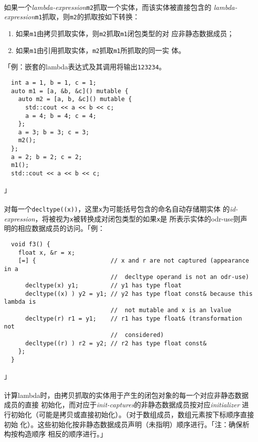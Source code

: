 \paragraph{}
如果一个\textit{lambda-expression}\texttt{m2}抓取一个实体，而该实体被直接包含的
\textit{lambda-expression}\texttt{m1}抓取，则\texttt{m2}的抓取按如下转换：
\begin{enumerate}
  \item{如果\texttt{m1}由拷贝抓取实体，则\texttt{m2}抓取\texttt{m1}闭包类型的对
    应非静态数据成员；}
  \item{如果\texttt{m1}由引用抓取实体，\texttt{m2}抓取\texttt{m1}所抓取的同一实
    体。}
\end{enumerate}
「例：嵌套的lambda表达式及其调用将输出\texttt{123234}。
\begin{lstlisting}
  int a = 1, b = 1, c = 1;
  auto m1 = [a, &b, &c]() mutable {
    auto m2 = [a, b, &c]() mutable {
      std::cout << a << b << c;
      a = 4; b = 4; c = 4;
    };
    a = 3; b = 3; c = 3;
    m2();
  };
  a = 2; b = 2; c = 2;
  m1();
  std::cout << a << b << c;
\end{lstlisting}」

\paragraph{}
对每一个\texttt{decltype((x))}，这里\texttt{x}为可能括号包含的命名自动存储期实体
的\textit{id-expression}，将被视为\texttt{x}被转换成对闭包类型的如果\texttt{x}是
所表示实体的odr-use则声明的相应数据成员的访问。「例：
\begin{lstlisting}
  void f3() {
    float x, &r = x;
    [=] {                     // x and r are not captured (appearance in a
                              //  decltype operand is not an odr-use)
      decltype(x) y1;         // y1 has type float
      decltype((x) ) y2 = y1; // y2 has type float const& because this lambda is
                              //  not mutable and x is an lvalue
      decltype(r) r1 = y1;    // r1 has type float& (transformation not
                              //  considered)
      decltype((r) ) r2 = y2; // r2 has type float const&
    };
  }
\end{lstlisting}」

\paragraph{}
计算lambda时，由拷贝抓取的实体用于产生的闭包对象的每一个对应非静态数据成员的直接
初始化，而对应于\textit{init-captures}的非静态数据成员按对应\textit{initializer}
进行初始化（可能是拷贝或直接初始化）。（对于数组成员，数组元素按下标顺序直接初始
化）。这些初始化按非静态数据成员声明（未指明）顺序进行。「注：确保析构按构造顺序
相反的顺序进行。」

